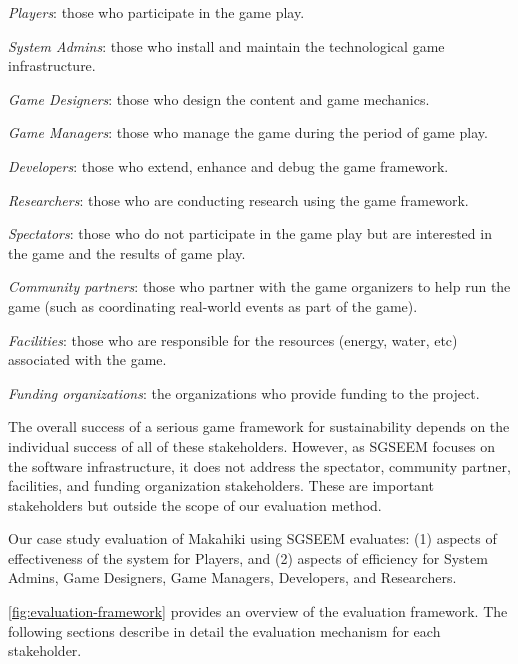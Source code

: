 \documentclass{sigchi}
\begin{document}
\begin{compactitem}
\item \emph{Players}: those who participate in the game play.
\item \emph{System Admins}: those who install and maintain the technological game infrastructure.
\item \emph{Game Designers}: those who design the content and game mechanics.
 \item \emph{Game Managers}: those who manage the game during the period of game play.
\item \emph{Developers}: those who extend, enhance and debug the game framework.
\item \emph{Researchers}: those who are conducting research using the game framework.
\item \emph{Spectators}: those who do not participate in the game
  play but are interested in the game and the results of game play.
\item \emph{Community partners}: those who partner
  with the game organizers to help run the game (such as coordinating real-world events as part of the game).
\item \emph{Facilities}: those who are responsible for the resources (energy, water, etc)
  associated with the game.
\item \emph{Funding organizations}: the organizations who provide
  funding to the project.
\end{compactitem}

The overall success of a serious game framework for sustainability depends on the
individual success of all of these stakeholders. However, as SGSEEM focuses on the software
infrastructure, it does not address the spectator, community partner, facilities, and funding
organization stakeholders. These are important stakeholders but outside the scope of our
evaluation method.

Our case study evaluation of Makahiki using SGSEEM evaluates: (1) aspects of 
effectiveness of the system for Players, and (2) aspects of
efficiency for System Admins, Game Designers, Game Managers, Developers, and Researchers.

\autoref{fig:evaluation-framework} provides an overview of the evaluation framework. The
following sections describe in detail the evaluation mechanism for each stakeholder.
\end{document}
